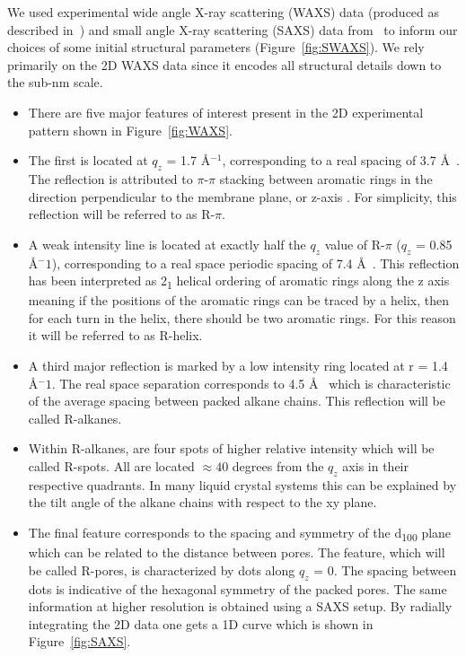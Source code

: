 \documentclass{article}
\newcommand{\angstrom}{\textup{\AA}}
\begin{document}
  We used experimental wide angle X-ray scattering (WAXS) data (produced as described 
  in~\cite{feng_scalable_2014}) and small angle X-ray scattering (SAXS) data from~\cite{feng_thin_2016}
  to inform our choices of some initial structural parameters (Figure~\ref{fig:SWAXS}). We rely primarily
  on the 2D WAXS data since it encodes all structural details down to the sub-nm scale.
  \begin{itemize}
        \item There are five major features of interest present in the 2D experimental
        pattern shown in Figure~\ref{fig:WAXS}.
        \item The first is located at $q_z$ = 1.7 \angstrom$^{-1}$,
        corresponding to a real spacing of 3.7 \angstrom~. The reflection is
        attributed to $\pi$-$\pi$ stacking between aromatic rings in the direction
        perpendicular to the membrane plane, or z-axis \cite{feng_scalable_2014}. For simplicity, this
        reflection will be referred to as R-$\pi$.
        \item A weak intensity line is located at exactly half the $q_z$ value of
        R-$\pi$ ($q_z$ = 0.85 \angstrom$^-1$), corresponding to a
        real space periodic spacing of 7.4 \angstrom~. This reflection has been
        interpreted  as 2\textsubscript{1} helical ordering of aromatic rings
        along the z axis meaning if the positions of the aromatic rings can
        be traced by a helix, then for each turn in the helix, there should be
        two aromatic rings. For this reason it will be referred to as R-helix.
        \item A third major reflection is marked by a low intensity ring located
        at r = 1.4 \angstrom$^-1$. The real space separation
        corresponds to 4.5 \angstrom~ which is characteristic of the average
        spacing between packed alkane chains. This reflection will be called R-alkanes.
        \item Within R-alkanes, are four spots of higher relative intensity which
        will be called R-spots. All are located $\approx 40$ degrees from the $q_z$ axis
        in their respective quadrants. In many liquid crystal systems this can be
        explained by the tilt angle of the alkane chains with respect to the xy plane. %
        \item The final feature corresponds to the spacing and symmetry of
        the d\textsubscript{100} plane which can be related to the distance between
        pores. The feature, which will be called R-pores, is characterized by dots
        along $q_z$ = 0. The spacing between dots is indicative of the hexagonal
        symmetry of the packed pores. The same information at higher resolution is obtained using a SAXS
        setup. By radially integrating the 2D data one gets a 1D curve which is 
        shown in Figure~\ref{fig:SAXS}.  %
  \end{itemize}
\end{document}
